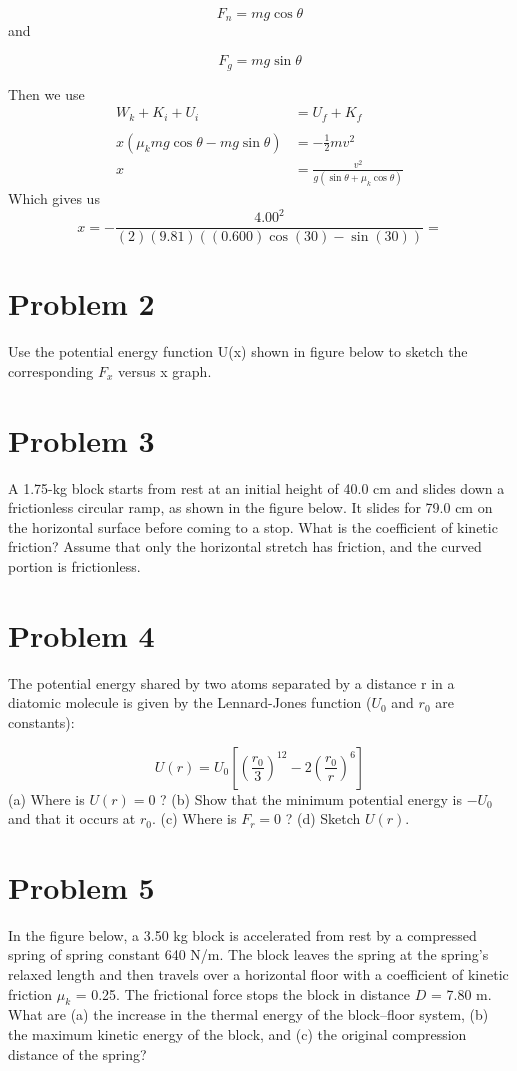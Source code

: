 \documentclass{article}
\begin{document}
\[
	F_n = mg\cos\theta
\]
and

\[
	F_g = mg\sin\theta
\]

Then we use
\begin{align*}
	W_k + K_i + U_i &= U_f + K_f \\
	\\
	x \left( \mu_k mg \cos \theta - mg \sin \theta \right) &= - \frac{1}{2}mv^2 \\
	x &= \frac{v^2}{g \left( \sin \theta + \mu_k \cos \theta \right)}
\end{align*}
Which gives us
\[
	x = -\frac{4.00^2}{(2)(9.81) \left((0.600) \cos (30) - \sin (30) \right)} =
\]

\section*{Problem 2}
Use the potential energy function U(x) shown in figure below to sketch the corresponding $F_x$ versus x
graph.

\section*{Problem 3}
A 1.75-kg block starts from rest at an initial height of 40.0 cm and slides down a frictionless circular ramp,
as shown in the figure below. It slides for 79.0 cm on the horizontal surface before coming to a stop. What is
the coefficient of kinetic friction? Assume that only the horizontal stretch has friction, and the curved portion
is frictionless.

\section*{Problem 4}
The potential energy shared by two atoms separated by a distance r in a diatomic molecule is given by the
Lennard-Jones function ($U_0$ and $r_0$ are constants):

\[
	U(r) = U_0 \left[ \left( \frac{r_0}{3} \right)^{12} - 2 \left( \frac{r_0}{r}\right)^6 \right]
\]
(a) Where is $U(r)=0$ ? (b) Show that the minimum potential energy is $-U_0$ and that it occurs at $r_0$. (c)
Where is $F_r = 0$ ? (d) Sketch $U(r)$.

\section*{Problem 5}
In the figure below, a 3.50 kg block is accelerated from rest by a compressed spring of spring constant 640
N/m. The block leaves the spring at the spring’s relaxed length and then travels over a horizontal floor with a
coefficient of kinetic friction $\mu_k$ = 0.25. The frictional force stops the block in distance $D$ = 7.80 m. What are
(a) the increase in the thermal energy of the block–floor system, (b) the maximum kinetic energy of the block,
and (c) the original compression distance of the spring?
\end{document}
